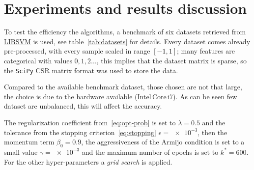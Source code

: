 \section{Experiments and results discussion}\label{sc:exp}




To test the efficiency the algorithms, a benchmark of six datasets retrieved from \href{https://www.csie.ntu.edu.tw/~cjlin/libsvmtools/datasets/}{LIBSVM} is used, see table~\vref{tab:datasets} for details. Every dataset comes already pre-processed, with every sample scaled in range $[-1,1]$; many features are categorical with values $0,1,2\dots$, this implies that the dataset matrix is sparse, so the \texttt{SciPy} CSR matrix format was used to store the data.

Compared to the available benchmark dataset, those chosen are not that large, the choice is due to the hardware available (Intel\textregistered\,Core\texttrademark\,i\num{7}). As can be seen few dataset are unbalanced, this will affect the accuracy.\par\smallskip

The regularization coefficient from~\eqref{eq:opt-prob} is set to $\lambda=0.5$ and the tolerance from the stopping criterion~\eqref{eq:stopping} $\epsilon=\num{e-3}$, then the momentum term $\beta_0=0.9$, the aggressiveness of the Armijo condition is set to a small value $\gamma=\num{e-3}$ and the maximum number of epochs is set to $k^\ast=600$. For the other hyper-parameters a \emph{grid search} is applied.

